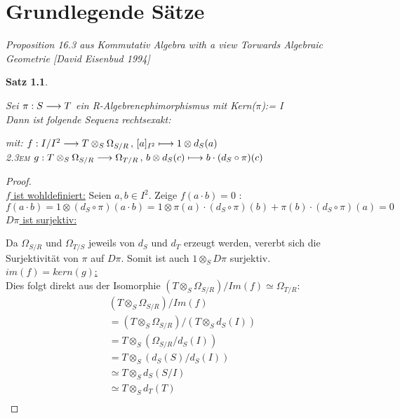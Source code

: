 \documentclass[10pt,a4paper]{report}
\newcommand{\ModulsOfDifferenzials}{Kommutativ Algebra with a view Torwards Algebraic Geometrie [David Eisenbud 1994]}
\newcounter{Aussage}[chapter]
\newtheorem{satz}[Aussage]{Satz}
\newcommand{\functionfront}[3]{\nolinebreak{#1:#2 \longrightarrow #3}}
\newcommand{\function}[5]{\nolinebreak{#1:#2 \longrightarrow #3 \, , \, #4 \longmapsto #5}}
\newcommand{\divR}[2]{\Omega_{#1/#2}}
\newcommand{\divf}[1]{d_{#1}}
\newcommand{\Tensor}[3]{#1 \otimes_{#2} #3}
\newcommand{\tensor}[3]{#1 \otimes #3}
\newcommand{\kernel}[1]{kern(#1)}
\newcommand{\immage}[1]{im(#1)}
\begin{document}
\chapter{Grundlegende Sätze}
\textit{Proposition 16.3 aus \ModulsOfDifferenzials}
\begin{satz} \label{prop16.3}
\raggedright
Sei $\functionfront{\pi}{S}{T}$ ein R-Algebrenephimorphismus mit Kern($\pi$):= I \\
Dann ist folgende Sequenz rechtsexakt: \\
\begin{center}
\end{center}
\begin{spacing}{1.5}
mit: $\function{f}{I/I^2}{{\Tensor{T}{S}{\divR{S}{R}}}}{[a]_{I^2}}{\tensor{1}{S}{\divf{S}(a)}}$\\
\textsc{\leftskip2.3em} $\function{g}{\Tensor{T}{S}{\divR{S}{R}}}{\divR{T}{R}}{\tensor{b}{S}{\divf{S}(c)}}{b \cdot (\divf{S} \circ \pi)(c)}$
\end{spacing}
\end{satz}

\begin{proof} \ \\
\underline{$f$ ist wohldefiniert:} Seien $a,b\in I^2$. Zeige $f(a \cdot b)=0$ :
$$ f(a \cdot b) =
\tensor{1}{S}{( \divf{S} \circ \pi )(a \cdot b)} =
\tensor{1}{S}{\pi(a) \cdot (\divf{S} \circ \pi )(b) + \pi(b) \cdot ( \divf{S} \circ \pi )(a)} = 0$$
\underline{$D\pi$ ist surjektiv:}

\begin{center}
\end{center}
Da $\divR{S}{R}$ und $\divR{T}{S}$ jeweils von $\divf{S}$ und $\divf{T}$ erzeugt werden, vererbt sich die Surjektivität von $\pi$ auf $D\pi$. Somit ist auch $\Tensor{1}{S}{D\pi}$ surjektiv.\\
\underline{$\immage{f}=\kernel{g}$:}\\ Dies folgt direkt aus  der Isomorphie $(\Tensor{T}{S}{\divR{S}{R}})/Im(f) \simeq \divR{T}{R}$:
\begin{align*}
(\Tensor{T}{S}{\divR{S}{R}})/Im(f) \\
= (\Tensor{T}{S}{\divR{S}{R}})/(\Tensor{T}{S}{\divf{S}(I)}) \\
= \Tensor{T}{S}{(\divR{S}{R}/\divf{S}(I))} \\ 
= \Tensor{T}{S}{(\divf{S}(S)/ \divf{S}(I))} \\
\simeq \Tensor{T}{S}{\divf{S}(S/I)} \\
\simeq \Tensor{T}{S}{\divf{T}(T)} \\
\end{align*}
\end{proof}
\end{document}
